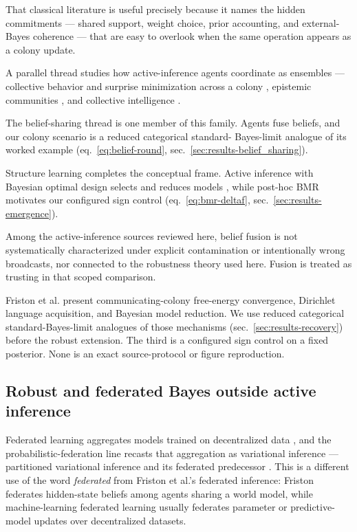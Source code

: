\documentclass[
  english,
]{article}
\theoremstyle{plain}
\theoremstyle{definition}
\theoremstyle{remark}
\theoremstyle{definition}
\begin{document}
That classical literature is useful precisely because it names the
hidden commitments --- shared support, weight choice, prior accounting,
and external-Bayes coherence --- that are easy to overlook when the same
operation appears as a colony update.

A parallel thread studies how active-inference agents coordinate as
ensembles --- collective behavior and surprise minimization across a
colony \citep{heins2023collective}, epistemic communities
\citep{albarracin2022epistemic}, and collective intelligence
\citep{kaufmann2021collective}.

The belief-sharing thread \citep{friston2024federated} is one member of
this family. Agents fuse beliefs, and our colony scenario is a reduced
categorical standard- Bayes-limit analogue of its worked example
(eq.~\ref{eq:belief-round}, sec.~\ref{sec:results-belief_sharing}).

Structure learning completes the conceptual frame. Active inference with
Bayesian optimal design selects and reduces models
\citep{smith2020active}, while post-hoc BMR \citep{friston2011post}
motivates our configured sign control (eq.~\ref{eq:bmr-deltaf},
sec.~\ref{sec:results-emergence}).

Among the active-inference sources reviewed here, belief fusion is not
systematically characterized under explicit contamination or
intentionally wrong broadcasts, nor connected to the robustness theory
used here. Fusion is treated as trusting in that scoped comparison.

Friston et al. \citeyearpar{friston2024federated} present
communicating-colony free-energy convergence, Dirichlet language
acquisition, and Bayesian model reduction. We use reduced categorical
standard-Bayes-limit analogues of those mechanisms
(sec.~\ref{sec:results-recovery}) before the robust extension. The third
is a configured sign control on a fixed posterior. None is an exact
source-protocol or figure reproduction.

\subsection{Robust and federated Bayes outside active
inference}\label{sec:related-fl}

Federated learning aggregates models trained on decentralized data
\citep{mcmahan2017communication}, and the probabilistic-federation line
recasts that aggregation as variational inference --- partitioned
variational inference \citep{ashman2022partitioned} and its federated
predecessor \citep{bui2018partitioned}. This is a different use of the
word \emph{federated} from Friston et al.'s federated inference: Friston
federates hidden-state beliefs among agents sharing a world model, while
machine-learning federated learning usually federates parameter or
predictive-model updates over decentralized datasets.
\end{document}
